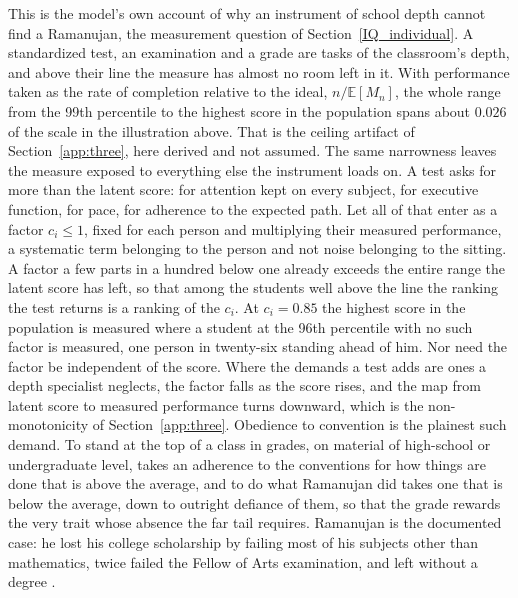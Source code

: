 \documentclass{article}
\begin{document}
This is the model's own account of why an instrument of school depth cannot find a Ramanujan, the measurement question of Section~\ref{IQ_individual}. A standardized test, an examination and a grade are tasks of the classroom's depth, and above their line the measure has almost no room left in it. With performance taken as the rate of completion relative to the ideal, $n/\mathbb{E}[M_n]$, the whole range from the 99th percentile to the highest score in the population spans about $0.026$ of the scale in the illustration above. That is the ceiling artifact of Section~\ref{app:three}, here derived and not assumed. The same narrowness leaves the measure exposed to everything else the instrument loads on. A test asks for more than the latent score: for attention kept on every subject, for executive function, for pace, for adherence to the expected path. Let all of that enter as a factor $c_i \le 1$, fixed for each person and multiplying their measured performance, a systematic term belonging to the person and not noise belonging to the sitting. A factor a few parts in a hundred below one already exceeds the entire range the latent score has left, so that among the students well above the line the ranking the test returns is a ranking of the $c_i$. At $c_i = 0.85$ the highest score in the population is measured where a student at the 96th percentile with no such factor is measured, one person in twenty-six standing ahead of him. Nor need the factor be independent of the score. Where the demands a test adds are ones a depth specialist neglects, the factor falls as the score rises, and the map from latent score to measured performance turns downward, which is the non-monotonicity of Section~\ref{app:three}. Obedience to convention is the plainest such demand. To stand at the top of a class in grades, on material of high-school or undergraduate level, takes an adherence to the conventions for how things are done that is above the average, and to do what Ramanujan did takes one that is below the average, down to outright defiance of them, so that the grade rewards the very trait whose absence the far tail requires. Ramanujan is the documented case: he lost his college scholarship by failing most of his subjects other than mathematics, twice failed the Fellow of Arts examination, and left without a degree \cite{kanigel1991man}.
\end{document}
